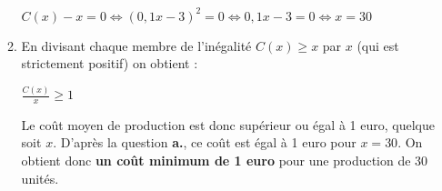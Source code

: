 \begin{corrige}
\begin{enumerate}
\begin{enumerate}[label=\alph*.]
               $C\left(x\right)-x=0 \Leftrightarrow \left(0,1x-3\right)^{2}=0 \Leftrightarrow 0,1x-3=0 \Leftrightarrow x=30 $
               \item
               En divisant chaque membre de l'inégalité $C\left(x\right)\geqslant x$ par $x$ (qui est strictement positif) on obtient :
               \par
               $\frac{C\left(x\right)}{x}\geqslant 1$
               \par
               Le coût moyen de production est donc supérieur ou égal à 1 euro, quelque soit $x$. D'après la question \textbf{a.}, ce coût est égal à 1 euro pour $x=30$. On obtient donc \textbf{un coût minimum de 1 euro} pour une production de 30 unités.
          \end{enumerate}
     \end{enumerate}
\end{corrige}
